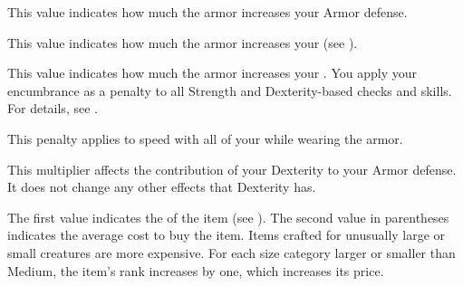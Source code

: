          This value indicates how much the armor increases your Armor defense.

         This value indicates how much the armor increases your  (see ).

         This value indicates how much the armor increases your .
        You apply your encumbrance as a penalty to all Strength and Dexterity-based checks and skills.
        For details, see .

         This penalty applies to speed with all of your  while wearing the armor.

         This multiplier affects the contribution of your Dexterity to your Armor defense.
        It does not change any other effects that Dexterity has.

         The first value indicates the  of the item (see ).
        The second value in parentheses indicates the average cost to buy the item.
        Items crafted for unusually large or small creatures are more expensive.
        For each size category larger or smaller than Medium, the item's rank increases by one, which increases its price.

